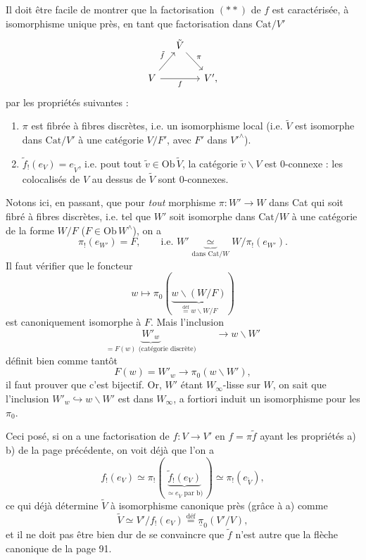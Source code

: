 \documentclass[11pt]{article}
\newcommand{\printedpage}[1]{\marginpar{\footnotesize p.~#1}}
\newcommand{\msp}[1]{\marginpar{\footnotesize [#1]}}
\newcommand{\Cat}{\mathrm{Cat}}
\newcommand{\Ob}{\mathrm{Ob}\,}
\newcommand{\defeq}{\overset{\text{déf}}{=}}
\newcommand{\upi}{\underline{\pi}}
\begin{document}
Il doit être facile de montrer que la factorisation $(**)$ de $f$ est caractérisée, à isomorphisme unique près, en tant que
\printedpage{65}
\msp{page 92}
factorisation dans $\Cat/V'$
\[
\begin{tikzcd}[column sep=small]
 & \tilde{V} \arrow[dr, "\pi"] & \\
V \arrow[ur, "\tilde{f}"] \arrow[rr, "f"'] & & V',
\end{tikzcd}
\]
par les propriétés suivantes :
\begin{enumerate}[label={}, leftmargin=*]
\item[a)] $\pi$ est fibrée à fibres discrètes, i.e. un isomorphisme local (i.e. $\tilde{V}$ est isomorphe dans $\Cat/V'$ à une catégorie $V/F'$, avec $F'$ dans $V'^{\wedge}$). %
\item[b)] $\tilde{f}_!(e_V) = e_{\tilde{V}}$, i.e. pout tout $\tilde{v} \in \Ob \tilde{V}$, la catégorie $\tilde{v}\backslash V$ est 0-connexe : les colocalisés de $V$ au dessus de $\tilde{V}$ sont 0-connexes. %
\end{enumerate}

Notons ici, en passant, que pour \textit{tout} morphisme $\pi : W' \longrightarrow W$ dans Cat qui soit fibré à fibres discrètes, i.e. tel que $W'$ soit isomorphe dans $\Cat/W$ à une catégorie de la forme $W/F$ ($F \in \Ob W^{\wedge}$), on a
\[ \pi_!(e_{W'}) = F, \qquad \text{i.e. } W' \underbrace{\ \simeq\ }_{\text{dans } \Cat/W} W/\pi_!(e_{W'}). \tag*{$(*)$} \]
Il faut vérifier que le foncteur
\[ w \longmapsto \pi_0(\underbrace{w\backslash(W/F)}_{\defeq w\backslash W/F}) \]
est canoniquement isomorphe à $F$. Mais l'inclusion
\[ \underbrace{W'_w}_{= F(w) \text{ (catégorie discrète)}} \qquad \longrightarrow w\backslash W' \]
\msp{page 93}
définit bien comme tantôt
\[ F(w) = W'_w \longrightarrow \pi_0(w\backslash W'), \]
il faut prouver que c'est bijectif. Or, $W'$ étant $W_\infty$-lisse sur $W$, on sait que l'inclusion $W'_w \hookrightarrow w\backslash W'$ est dans $W_\infty$, a fortiori induit un isomorphisme pour les $\pi_0$.

Ceci posé, si on a une factorisation de $f : V \longrightarrow V'$ en $f = \pi\tilde{f}$ ayant les propriétés a) b) de la page précédente, on voit déjà que l'on a
\[ f_!(e_V) \simeq \pi_!(\, \underbrace{\tilde{f}_!(e_V)}_{\simeq e_{\tilde{V}} \text{ par b)}} \,) \simeq \pi_!(e_{\tilde{V}}), \]
ce qui déjà détermine $\tilde{V}$ à isomorphisme canonique près (grâce à a) comme
\[ \tilde{V} \simeq V'/f_!(e_V) \defeq \upi_0(V'/V), \] %
\printedpage{66}
et il ne doit pas être bien dur de se convaincre que $\tilde{f}$ n'est autre que la flèche canonique de la page 91.
\end{document}
